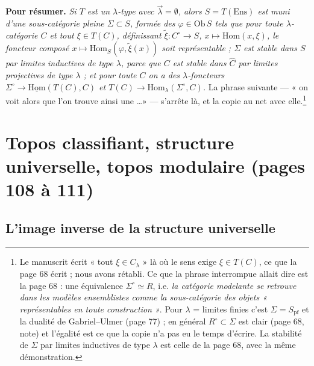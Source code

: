 \documentclass[11pt,a4paper]{article}
\begin{document}
\textbf{Pour résumer.} \emph{Si $T$ est un $\lambda$-type avec
$\overrightarrow{\lambda} = \emptyset$, alors $S = T(\mathrm{Ens})$ est muni
d'une sous-catégorie pleine $\Sigma \subset S$, formée des $\varphi \in
\mathrm{Ob}\,S$ tels que pour toute $\lambda$-catégorie $C$ et tout $\xi \in
T(C)$, définissant $\tilde\xi : C^{\circ} \to S$, $x \mapsto \mathrm{Hom}(x,
\xi)$, le foncteur composé $x \mapsto \mathrm{Hom}_{S}(\varphi, \tilde\xi(x))$
soit représentable ; $\Sigma$ est stable dans $S$ par limites inductives
de type $\lambda$, parce que $C$ est stable dans $\widehat{C}$ par limites
projectives de type $\lambda$ ; et pour toute $C$ on a des $\lambda$-foncteurs $\Sigma^{\circ}
\to \underline{\mathrm{Hom}}(T(C), C)$ et $T(C) \to \mathrm{Hom}_{\lambda}(
\Sigma^{\circ}, C)$.} La phrase suivante — « on voit alors que l'on trouve
ainsi une \ldots » — s'arrête là, et la copie au net avec
elle.\footnote{Le manuscrit écrit « tout $\xi \in C_{\lambda}$ » là où le
sens exige $\xi \in T(C)$, ce que la page 68 écrit ; nous avons rétabli.
Ce que la phrase interrompue allait dire est la page 68 : une équivalence
$\Sigma^{\circ} \simeq R$, i.e. \emph{la catégorie modelante se retrouve
dans les modèles ensemblistes comme la sous-catégorie des objets
« représentables en toute construction »}. Pour $\lambda$ = limites
finies c'est $\Sigma = S_{\mathrm{pf}}$ et la dualité de Gabriel--Ulmer
(page 77) ; en général $R^{\circ} \subset \Sigma$ est clair (page 68, note)
et l'égalité est ce que la copie n'a pas eu le temps d'écrire. La
stabilité de $\Sigma$ par limites inductives de type $\lambda$ est celle de
la page 68, avec la même démonstration.}

\section*{Topos classifiant, structure universelle, topos modulaire (pages 108 à 111)}

\subsection*{L'image inverse de la structure universelle}
\end{document}
